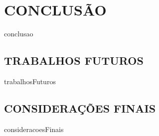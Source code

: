 
\chapter{CONCLUSÃO}
	\label{chap:conclusao}
	{conclusao}

\section{TRABALHOS FUTUROS}
	\label{sec:trabalhosFuturos}
	{trabalhosFuturos}

\section{CONSIDERAÇÕES FINAIS}
	\label{sec:consideracoesFinais}
	{consideracoesFinais}